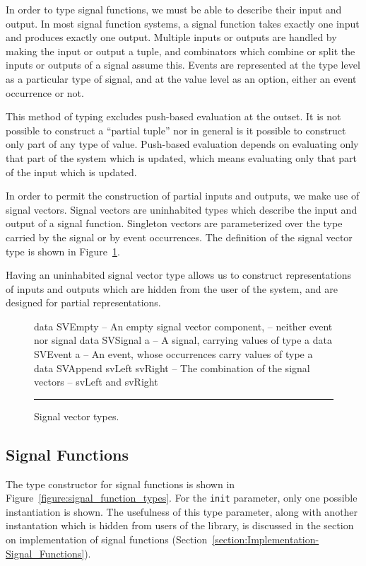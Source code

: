 In order to type signal functions, we must be able to describe their input and
output. In most signal function systems, a signal function takes exactly one
input and produces exactly one output. Multiple inputs or outputs are handled
by making the input or output a tuple, and combinators which combine or split
the inputs or outputs of a signal assume this. Events are represented at the
type level as a particular type of signal, and at the value level as an option,
either an event occurrence or not.

This method of typing excludes push-based evaluation at the outset.
It is not possible to construct a ``partial tuple'' nor in general is it
possible to construct only part of any type of value. Push-based evaluation
depends on evaluating only that part of the system which is updated, which means
evaluating only that part of the input which is updated.

In order to permit the construction of partial inputs and outputs, we make use
of signal vectors. Signal vectors are uninhabited types which describe the input
and output of a signal function. Singleton vectors are parameterized over the
type carried by the signal or by event occurrences. The definition of the signal
vector type is shown in Figure~\ref{figure:signal_vector_types}. 

Having an uninhabited signal vector type allows us to construct representations
of inputs and outputs which are hidden from the user of the system, and are
designed for partial representations.

\begin{figure}
\begin{code}
data SVEmpty    -- An empty signal vector component,
                -- neither event nor signal
data SVSignal a -- A signal, carrying values of type a
data SVEvent a  -- An event, whose occurrences carry values of type a
data SVAppend svLeft svRight -- The combination of the signal vectors
                             -- svLeft and svRight
\end{code}
\hrule
\caption{Signal vector types.}
\label{figure:signal_vector_types}
\end{figure}

\subsection{Signal Functions}
\label{subsection:System_Design_and_Interface-Types-Signal_Functions}

The type constructor for signal functions is shown in
Figure~\ref{figure:signal_function_types}. For the {\tt init} parameter, only
one possible instantiation is shown. The usefulness of this type parameter,
along with another instantation which is hidden from users of the library,
is discussed in the section on implementation of signal functions
(Section~\ref{section:Implementation-Signal_Functions}).

